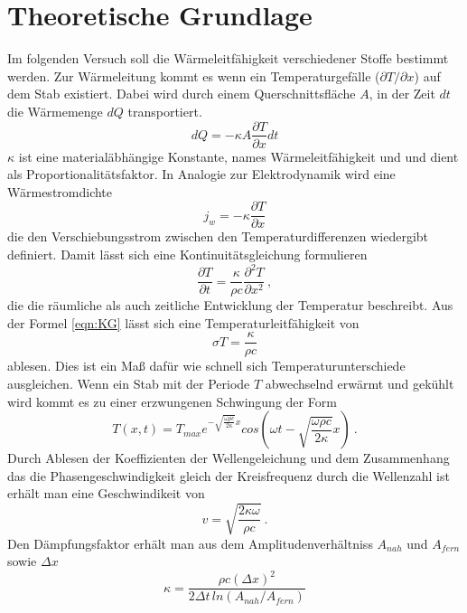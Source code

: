 \section{Theoretische Grundlage}
\label{sec:Theorie}
Im folgenden Versuch soll die Wärmeleitfähigkeit verschiedener Stoffe bestimmt werden. Zur Wärmeleitung kommt es wenn ein Temperaturgefälle ($\partial T / \partial x$) auf dem Stab existiert. Dabei wird durch einem Querschnittsfläche $A$, in der Zeit $dt$ die Wärmemenge $dQ$ transportiert.
\begin{equation}
	\label{eqn:Q/t}
	dQ = - \kappa A \frac{\partial T}{\partial x} dt
\end{equation}
$\kappa$ ist eine materialäbhängige Konstante, names Wärmeleitfähigkeit und und dient als Proportionalitätsfaktor. In Analogie zur Elektrodynamik wird eine Wärmestromdichte 
\begin{equation}
	j_w = - \kappa \frac{\partial T}{\partial x}
\end{equation}
die den Verschiebungsstrom zwischen den Temperaturdifferenzen wiedergibt definiert. Damit lässt sich eine Kontinuitätsgleichung formulieren
\begin{equation}
	\label{eqn:KG}
	\frac{\partial T}{\partial t} = \frac{\kappa}{\rho c} \frac{\partial^2 T}{\partial x^2} \ ,
\end{equation}
die die räumliche als auch zeitliche Entwicklung der Temperatur beschreibt. Aus der Formel \ref{eqn:KG} lässt sich eine Temperaturleitfähigkeit von
\begin{equation}
	\sigma T = \frac{\kappa}{\rho c}
\end{equation}
ablesen. Dies ist ein Maß dafür wie schnell sich Temperaturunterschiede ausgleichen. Wenn ein Stab mit der Periode $T$ abwechselnd erwärmt und gekühlt wird kommt es zu einer erzwungenen Schwingung der Form 
\begin{equation}
	T(x,t) = T_{max}e^{-\sqrt{\frac{\omega \rho c}{2 \kappa}}x}cos \left( \omega t - \sqrt{ \frac{\omega \rho c}{2 \kappa}}x \right) \ .
\end{equation}
Durch Ablesen der Koeffizienten der Wellengeleichung und dem Zusammenhang das die Phasengeschwindigkeit gleich der Kreisfrequenz durch die Wellenzahl ist erhält man eine Geschwindikeit von
\begin{equation}
	\label{eqn:v}
	v = \sqrt{ \frac{2 \kappa \omega}{\rho c}} \ .
\end{equation}
Den Dämpfungsfaktor erhält man aus dem Amplitudenverhältniss $A_{nah}$ und $A_{fern}$ sowie $\Delta x$
\begin{equation}
	\label{eqn:kappa}
	\kappa = \frac{\rho c (\Delta x)^2}{2 \Delta t \, ln(A_{nah}/A_{fern})}
\end{equation}

